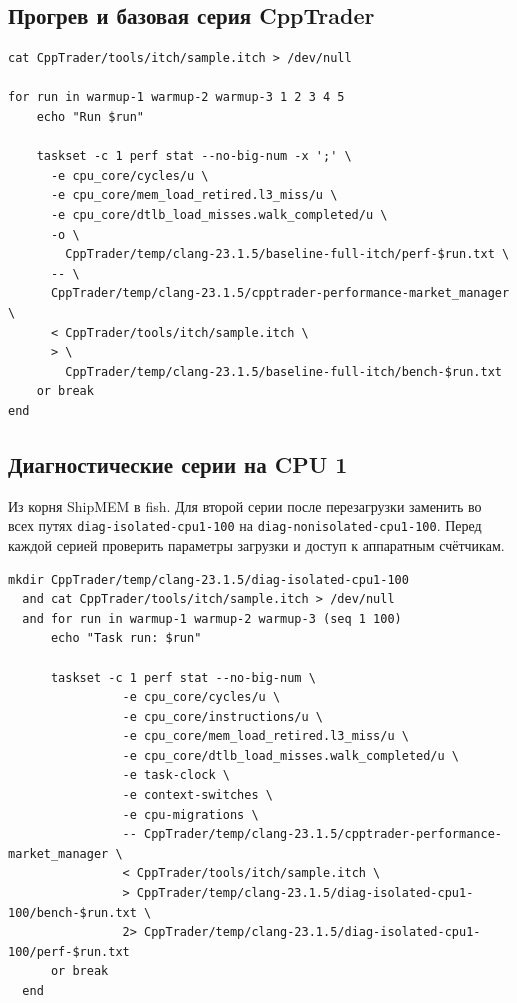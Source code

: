 \documentclass[a4paper,12pt]{article}
\begin{document}
\subsection{Прогрев и базовая серия CppTrader}
\label{app:cmd-baseline}
\begin{lstlisting}
cat CppTrader/tools/itch/sample.itch > /dev/null

for run in warmup-1 warmup-2 warmup-3 1 2 3 4 5
    echo "Run $run"

    taskset -c 1 perf stat --no-big-num -x ';' \
      -e cpu_core/cycles/u \
      -e cpu_core/mem_load_retired.l3_miss/u \
      -e cpu_core/dtlb_load_misses.walk_completed/u \
      -o \
        CppTrader/temp/clang-23.1.5/baseline-full-itch/perf-$run.txt \
      -- \
      CppTrader/temp/clang-23.1.5/cpptrader-performance-market_manager \
      < CppTrader/tools/itch/sample.itch \
      > \
        CppTrader/temp/clang-23.1.5/baseline-full-itch/bench-$run.txt
    or break
end
\end{lstlisting}

\subsection{Диагностические серии на CPU 1}
\label{app:cmd-diag-cpu1}

Из корня ShipMEM в fish. Для второй серии после перезагрузки
заменить во всех путях \texttt{diag-isolated-cpu1-100} на
\texttt{diag-nonisolated-cpu1-100}. Перед каждой серией проверить
параметры загрузки и доступ к аппаратным счётчикам.
\begin{lstlisting}
mkdir CppTrader/temp/clang-23.1.5/diag-isolated-cpu1-100
  and cat CppTrader/tools/itch/sample.itch > /dev/null
  and for run in warmup-1 warmup-2 warmup-3 (seq 1 100)
      echo "Task run: $run"

      taskset -c 1 perf stat --no-big-num \
                -e cpu_core/cycles/u \
                -e cpu_core/instructions/u \
                -e cpu_core/mem_load_retired.l3_miss/u \
                -e cpu_core/dtlb_load_misses.walk_completed/u \
                -e task-clock \
                -e context-switches \
                -e cpu-migrations \
                -- CppTrader/temp/clang-23.1.5/cpptrader-performance-market_manager \
                < CppTrader/tools/itch/sample.itch \
                > CppTrader/temp/clang-23.1.5/diag-isolated-cpu1-100/bench-$run.txt \
                2> CppTrader/temp/clang-23.1.5/diag-isolated-cpu1-100/perf-$run.txt
      or break
  end
\end{lstlisting}
\end{document}
